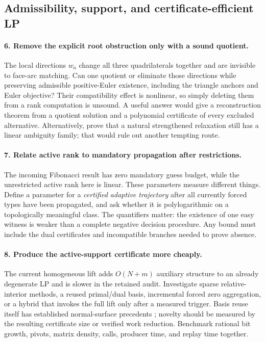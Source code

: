 \subsection{Admissibility, support, and certificate-efficient LP}

\paragraph{6. Remove the explicit root obstruction only with a sound quotient.}
The local directions $w_a$ change all three quadrilaterals together and are
invisible to face-arc matching. Can one quotient or eliminate those
directions while preserving admissible positive-Euler existence, including
the triangle anchors and Euler objective? Their compatibility effect is
nonlinear, so simply deleting them from a rank computation is unsound.
A useful answer would give a reconstruction theorem from a quotient
solution and a polynomial certificate of every excluded alternative.
Alternatively, prove that a natural strengthened relaxation still has a
linear ambiguity family; that would rule out another tempting route.

\paragraph{7. Relate active rank to mandatory propagation after restrictions.}
The incoming Fibonacci result has zero mandatory guess budget, while the
unrestricted active rank here is linear. These parameters measure different
things. Define a parameter for a \emph{certified adaptive trajectory} after
all currently forced types have been propagated, and ask whether it is
polylogarithmic on a topologically meaningful class. The quantifiers matter:
the existence of one easy witness is weaker than a complete negative
decision procedure. Any bound must include the dual certificates and
incompatible branches needed to prove absence.

\paragraph{8. Produce the active-support certificate more cheaply.}
The current homogeneous lift adds $O(N+m)$ auxiliary structure to an already
degenerate LP and is slower in the retained audit. Investigate sparse
relative-interior methods, a reused primal/dual basis, incremental forced
zero aggregation, or a hybrid that invokes the full lift only after a
measured trigger. Basis reuse itself has established normal-surface
precedents \cite{BurtonTree}; novelty should be measured by the resulting
certificate size or verified work reduction. Benchmark rational bit growth,
pivots, matrix density, calls, producer time, and replay time together.

